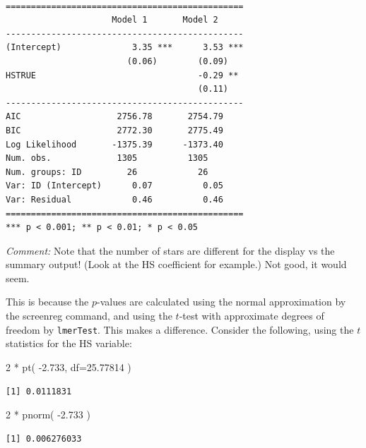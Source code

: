 \documentclass[
  letterpaper,
  DIV=11,
  numbers=noendperiod]{scrreprt}
\newenvironment{Shaded}{\begin{snugshade}}{\end{snugshade}}
\newcommand{\AttributeTok}[1]{\textcolor[rgb]{0.49,0.56,0.16}{#1}}
\newcommand{\DecValTok}[1]{\textcolor[rgb]{0.25,0.63,0.44}{#1}}
\newcommand{\FloatTok}[1]{\textcolor[rgb]{0.25,0.63,0.44}{#1}}
\newcommand{\FunctionTok}[1]{\textcolor[rgb]{0.02,0.16,0.49}{#1}}
\newcommand{\NormalTok}[1]{\textcolor[rgb]{0.00,0.44,0.13}{#1}}
\newcommand{\SpecialCharTok}[1]{\textcolor[rgb]{0.25,0.44,0.63}{#1}}
\begin{document}
\begin{verbatim}

===============================================
                     Model 1       Model 2     
-----------------------------------------------
(Intercept)              3.35 ***      3.53 ***
                        (0.06)        (0.09)   
HSTRUE                                -0.29 ** 
                                      (0.11)   
-----------------------------------------------
AIC                   2756.78       2754.79    
BIC                   2772.30       2775.49    
Log Likelihood       -1375.39      -1373.40    
Num. obs.             1305          1305       
Num. groups: ID         26            26       
Var: ID (Intercept)      0.07          0.05    
Var: Residual            0.46          0.46    
===============================================
*** p < 0.001; ** p < 0.01; * p < 0.05
\end{verbatim}

\emph{Comment:} Note that the number of stars are different for the
display vs the summary output! (Look at the HS coefficient for example.)
Not good, it would seem.

This is because the \(p\)-values are calculated using the normal
approximation by the screenreg command, and using the \(t\)-test with
approximate degrees of freedom by \texttt{lmerTest}. This makes a
difference. Consider the following, using the \(t\) statistics for the
HS variable:

\begin{Shaded}
\begin{Highlighting}[]
\DecValTok{2} \SpecialCharTok{*} \FunctionTok{pt}\NormalTok{( }\SpecialCharTok{{-}}\FloatTok{2.733}\NormalTok{, }\AttributeTok{df=}\FloatTok{25.77814}\NormalTok{ )}
\end{Highlighting}
\end{Shaded}

\begin{verbatim}
[1] 0.0111831
\end{verbatim}

\begin{Shaded}
\begin{Highlighting}[]
\DecValTok{2} \SpecialCharTok{*} \FunctionTok{pnorm}\NormalTok{( }\SpecialCharTok{{-}}\FloatTok{2.733}\NormalTok{ )}
\end{Highlighting}
\end{Shaded}

\begin{verbatim}
[1] 0.006276033
\end{verbatim}
\end{document}
